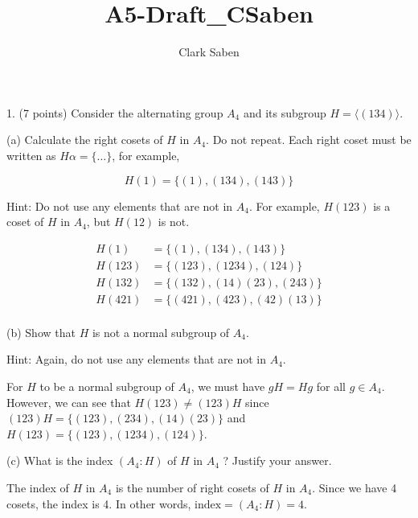 \documentclass[12pt]{article}
\newenvironment{problem}[2][Problem]{\begin{trivlist}
\item[\hskip \labelsep {\bfseries #1}\hskip \labelsep {\bfseries #2.}]}{\end{trivlist}}
\begin{document}
 
 
\title{A5-Draft\_CSaben}
\author{Clark Saben}

 
\maketitle


1. (7 points) Consider the alternating group $A_{4}$ and its subgroup $H=\langle(134)\rangle$.

\begin{problem}{1a}
(a) Calculate the right cosets of $H$ in $A_{4}$. Do not repeat. Each right coset must be written as $H \alpha=\{\ldots\}$, for example,

$$
H(1)=\{(1),(134),(143)\}
$$

Hint: Do not use any elements that are not in $A_{4}$. For example, $H(123)$ is a coset of $H$ in $A_{4}$, but $H(12)$ is not.
\end{problem}

$$
\begin{aligned}
	H(1) &= \{(1),(134),(143)\} \\
	H(123) &= \{(123),(1234),(124)\} \\
	H(132) &= \{(132),(14)(23),(243)\} \\
	H(421) &= \{(421),(423),(42)(13)\} \\
\end{aligned}
$$

\begin{problem}{1b}
(b) Show that $H$ is not a normal subgroup of $A_{4}$.

Hint: Again, do not use any elements that are not in $A_{4}$.
\end{problem}

For $H$ to be a normal subgroup of $A_4$, we must have $gH = Hg$ for all $g \in A_4$. However, we can see that $H(123) \neq (123)H$ since $(123)H = \{(123),(234),(14)(23)\}$ and $H(123) = \{(123),(1234),(124)\}$.

\begin{problem}{1c}
(c) What is the index $\left(A_{4}: H\right)$ of $H$ in $A_{4}$ ? Justify your answer.
\end{problem}	

The index of $H$ in $A_4$ is the number of right cosets of $H$ in $A_4$. Since we have 4 cosets, the index is 4. In other words,
$\text{index}=\left(A_{4}: H\right) = 4$.
\end{document}
